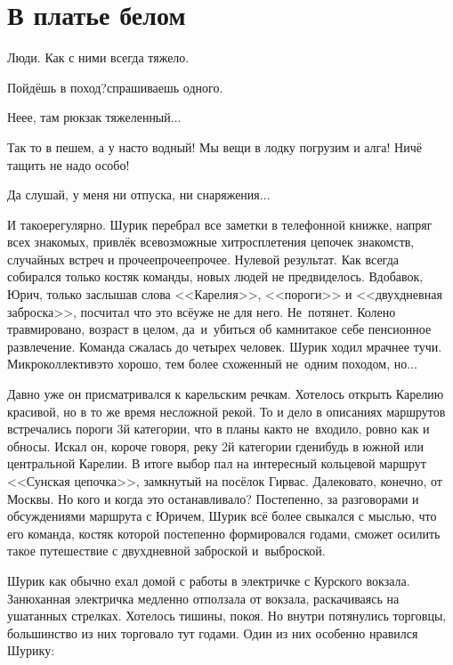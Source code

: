 {
\chapter{В платье белом}
\vepsianrose

\fancyhead[LE]{\fancyplain{}{\bfseries \parttitle}}
\fancyhead[RO]{\fancyplain{}{\bfseries \rightmark}}

Люди. Как с ними всегда тяжело.

\diagdash Пойдёшь в поход?\mdash спрашиваешь одного.

\diagdash Не\sdash е\sdash е, там рюкзак тяжеленный$\ldots$

\diagdash Так то в пешем, а у нас\sdash то водный! Мы вещи в лодку погрузим и алга! Ничё тащить не надо особо!

\diagdash Да слушай, у меня ни отпуска, ни снаряжения$\ldots$

И такое\mdash регулярно. Шурик перебрал все заметки в телефонной книжке, напряг всех знакомых, привлёк всевозможные хитросплетения цепочек знакомств, случайных встреч и прочее\sdash прочее\sdash прочее. Нулевой результат. Как всегда собирался только костяк команды, новых людей не предвиделось. Вдобавок, Юрич, только заслышав слова <<Карелия>>, <<пороги>> и <<двухдневная заброска>>, посчитал что это всё\mdash уже не для него. Не~потянет. Колено травмировано, возраст в целом, да~и~убиться об камни\mdash такое себе пенсионное развлечение. Команда сжалась до четырех человек. Шурик ходил мрачнее тучи. Микроколлектив\mdash это хорошо, тем более схоженный не~одним походом, но$\ldots$

Давно уже он присматривался к карельским речкам. Хотелось открыть Карелию красивой, но в то же время несложной рекой. То и дело в описаниях маршрутов встречались пороги 3\sdash й категории, что в планы как\sdash то не~входило, ровно как и обносы. Искал он, короче говоря, реку 2\sdash й категории где\sdash нибудь в южной или центральной Карелии. В итоге выбор пал на интересный кольцевой маршрут <<Сунская цепочка>>, замкнутый на посёлок Гирвас. Далековато, конечно, от Москвы. Но кого и когда это останавливало? Постепенно, за разговорами и обсуждениями маршрута с Юричем, Шурик всё более свыкался с мыслью, что его команда, костяк которой постепенно формировался годами, сможет осилить такое путешествие с двухдневной заброской и~выброской. 

Шурик как обычно ехал домой с работы в электричке с Курского вокзала. Занюханная электричка медленно отползала от вокзала, раскачиваясь на ушатанных стрелках. Хотелось тишины, покоя. Но внутри потянулись торговцы, большинство из них торговало тут годами. Один из них особенно нравился Шурику:

}
